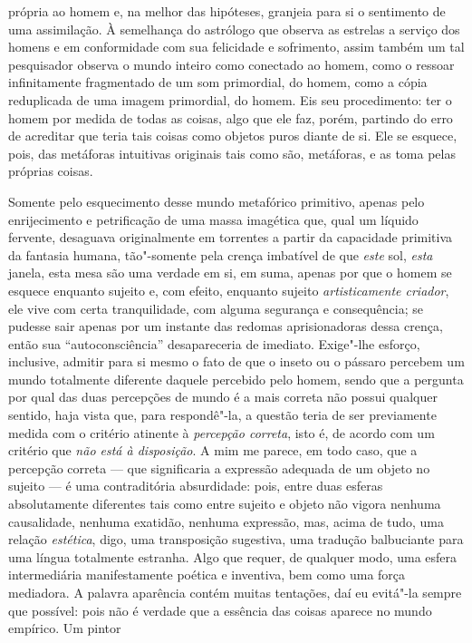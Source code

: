 própria ao homem e, na melhor das hipóteses, granjeia para si o
sentimento de uma assimilação. À semelhança do astrólogo que observa as
estrelas a serviço dos homens e em conformidade com sua felicidade e
sofrimento, assim também um tal pesquisador observa o mundo inteiro 
como conectado ao homem, como o ressoar infinitamente fragmentado de um
som primordial, do homem, como a cópia reduplicada de uma imagem
primordial, do homem. Eis seu procedimento: ter o homem por medida de
todas as coisas, algo que ele faz, porém, partindo do erro de acreditar
que teria tais coisas como objetos puros diante de si. Ele se esquece,
pois, das metáforas intuitivas originais tais como são, metáforas,
e as toma pelas próprias coisas.

Somente pelo esquecimento desse mundo metafórico primitivo, apenas pelo
enrijecimento e petrificação de uma massa imagética que, qual um
líquido fervente, desaguava originalmente em torrentes a partir da
capacidade primitiva da fantasia humana, tão"-somente pela crença imbatível
de que \textit{este} sol, \textit{esta} janela, esta mesa são uma
verdade em si, em suma, apenas por que o homem se esquece
enquanto sujeito e, com efeito, enquanto sujeito \textit{artisticamente
criador}, ele vive com certa tranquilidade, com alguma segurança e
consequência; se pudesse sair apenas por um instante das redomas
aprisionadoras dessa crença, então sua “autoconsciência” desapareceria
de imediato. Exige"-lhe esforço, inclusive, admitir para si mesmo o fato
de que o inseto ou o pássaro percebem um mundo totalmente diferente
daquele percebido pelo homem, sendo que a pergunta por qual das duas
percepções de mundo é a mais correta não possui qualquer sentido, haja
vista que, para respondê"-la, a questão teria de ser previamente
medida com o critério atinente à \textit{percepção correta}, isto é, de
acordo com um critério que \textit{não está à disposição}. A mim me
parece, em todo caso, que a percepção correta --- que significaria a
expressão adequada de um objeto no sujeito --- é uma contraditória
absurdidade: pois, entre duas esferas absolutamente diferentes tais
como entre sujeito e objeto não vigora nenhuma causalidade, nenhuma
exatidão, nenhuma expressão, mas, acima de tudo, uma relação
\textit{estética}, digo, uma transposição sugestiva, uma tradução
balbuciante para uma língua totalmente estranha. Algo que requer, de
qualquer modo, uma esfera intermediária manifestamente poética e
inventiva, bem como uma força mediadora. A palavra aparência contém
muitas tentações, daí eu evitá"-la sempre que possível: pois não é
verdade que a essência das coisas aparece no mundo empírico. Um pintor

